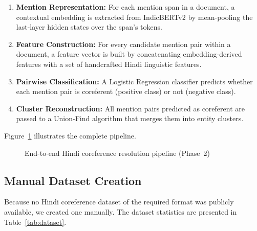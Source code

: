 \documentclass[12pt,a4paper]{report}
\begin{document}
\begin{enumerate}
    \item \textbf{Mention Representation:} For each mention span in a document, a contextual embedding is extracted from IndicBERTv2 by mean-pooling the last-layer hidden states over the span's tokens.
    \item \textbf{Feature Construction:} For every candidate mention pair within a document, a feature vector is built by concatenating embedding-derived features with a set of handcrafted Hindi linguistic features.
    \item \textbf{Pairwise Classification:} A Logistic Regression classifier predicts whether each mention pair is coreferent (positive class) or not (negative class).
    \item \textbf{Cluster Reconstruction:} All mention pairs predicted as coreferent are passed to a Union-Find algorithm that merges them into entity clusters.
\end{enumerate}

Figure~\ref{fig:system_arch} illustrates the complete pipeline.

\begin{figure}[H]
\centering
{}
\caption{End-to-end Hindi coreference resolution pipeline (Phase~2)}
\label{fig:system_arch}
\end{figure}

\subsection{Manual Dataset Creation}

Because no Hindi coreference dataset of the required format was publicly available, we created one manually. The dataset statistics are presented in Table~\ref{tab:dataset}.
\end{document}
